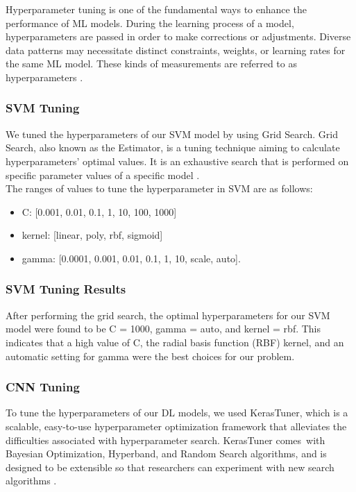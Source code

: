 \documentclass[12pt]{diazessay}
\begin{document}
    \-\hspace{0.7cm} Hyperparameter tuning is one of the fundamental ways to enhance the performance of ML models. During the learning process of a model, hyperparameters are passed in order to make corrections or adjustments. Diverse data patterns may necessitate distinct constraints, weights, or learning rates for the same ML model. These kinds of measurements are referred to as hyperparameters \cite{pon2021hyperparameter}.

    
     \subsubsection {SVM Tuning}
     \-\hspace{0.7cm} We tuned the hyperparameters of our SVM model by using Grid Search. Grid Search, also known as the Estimator, is a tuning technique aiming to calculate hyperparameters' optimal values. It is an exhaustive search that is performed on specific parameter values of a specific model \cite{malik2020grid}. \\

     The ranges of values to tune the hyperparameter in SVM are as follows:
    \begin{itemize}
     \item C: [0.001, 0.01, 0.1, 1, 10, 100, 1000]
     \item kernel: [linear, poly, rbf, sigmoid]
      \item gamma: [0.0001, 0.001, 0.01, 0.1, 1, 10, scale, auto].
     \end{itemize}

     \subsubsection {SVM Tuning Results}

    \-\hspace{0.7cm} After performing the grid search, the optimal hyperparameters for our SVM model were found to be C = 1000, gamma = auto, and kernel = rbf. This indicates that a high value of C, the radial basis function (RBF) kernel, and an automatic setting for gamma were the best choices for our problem.



    \subsubsection {CNN Tuning}
     \-\hspace{0.7cm} To tune the hyperparameters of our DL models, we used KerasTuner, which is a scalable, easy-to-use hyperparameter optimization framework that alleviates the difficulties associated with hyperparameter search. KerasTuner comes with Bayesian Optimization, Hyperband, and Random Search algorithms, and is designed to be extensible so that researchers can experiment with new search algorithms \cite{chollet2015keras}.
\end{document}
